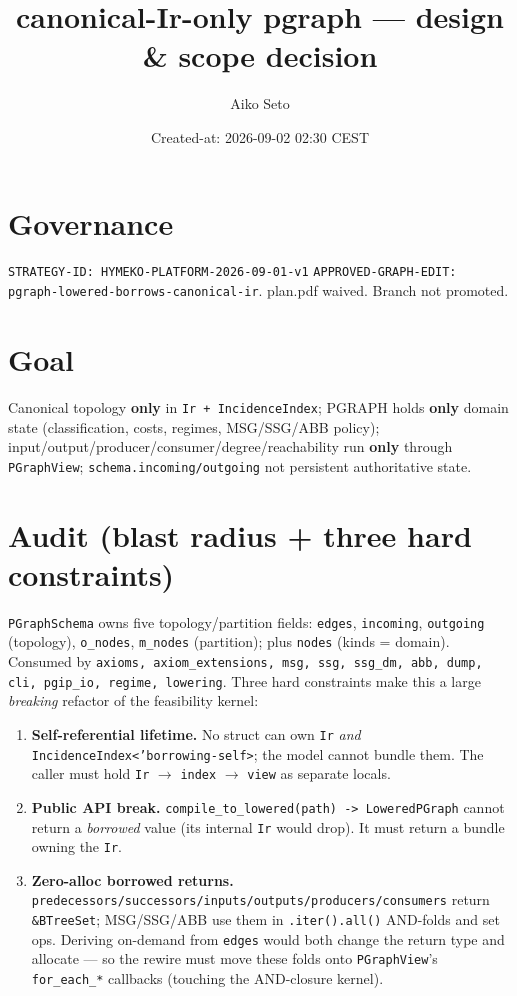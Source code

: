 \documentclass[11pt]{article}\usepackage[margin=1in]{geometry}\usepackage{hyperref}\usepackage{longtable}
\title{canonical-Ir-only pgraph --- design \& scope decision}\author{Aiko Seto}
\date{Created-at: 2026-09-02 02:30 CEST}
\begin{document}
\maketitle
\section*{Governance}
\texttt{STRATEGY-ID: HYMEKO-PLATFORM-2026-09-01-v1} \textperiodcentered{}
\texttt{APPROVED-GRAPH-EDIT: pgraph-lowered-borrows-canonical-ir}. plan.pdf waived. Branch not promoted.
\section*{Goal}
Canonical topology \textbf{only} in \texttt{Ir + IncidenceIndex}; PGRAPH holds \textbf{only} domain state
(classification, costs, regimes, MSG/SSG/ABB policy); input/output/producer/consumer/degree/reachability run
\textbf{only} through \texttt{PGraphView}; \texttt{schema.incoming/outgoing} not persistent authoritative state.
\section*{Audit (blast radius + three hard constraints)}
\texttt{PGraphSchema} owns five topology/partition fields: \texttt{edges}, \texttt{incoming}, \texttt{outgoing}
(topology), \texttt{o\_nodes}, \texttt{m\_nodes} (partition); plus \texttt{nodes} (kinds = domain). Consumed by
\texttt{axioms, axiom\_extensions, msg, ssg, ssg\_dm, abb, dump, cli, pgip\_io, regime, lowering}. Three hard
constraints make this a large \emph{breaking} refactor of the feasibility kernel:
\begin{enumerate}
\item \textbf{Self-referential lifetime.} No struct can own \texttt{Ir} \emph{and} \texttt{IncidenceIndex<'borrowing-self>};
the model cannot bundle them. The caller must hold \texttt{Ir} $\to$ \texttt{index} $\to$ \texttt{view} as
separate locals.
\item \textbf{Public API break.} \texttt{compile\_to\_lowered(path) -> LoweredPGraph} cannot return a
\emph{borrowed} value (its internal \texttt{Ir} would drop). It must return a bundle owning the \texttt{Ir}.
\item \textbf{Zero-alloc borrowed returns.} \texttt{predecessors/successors/inputs/outputs/producers/consumers}
return \texttt{\&BTreeSet}; MSG/SSG/ABB use them in \texttt{.iter().all()} AND-folds and set ops. Deriving
on-demand from \texttt{edges} would both change the return type and allocate --- so the rewire must move these
folds onto \texttt{PGraphView}'s \texttt{for\_each\_*} callbacks (touching the AND-closure kernel).
\end{enumerate}
\end{document}
